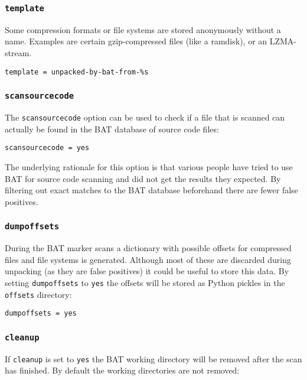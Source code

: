 \documentclass[10pt,a4paper]{article}
\begin{document}
\subsubsection{\texttt{template}}

Some compression formats or file systems are stored anonymously without a name.
Examples are certain gzip-compressed files (like a ramdisk), or an LZMA-stream.

\begin{verbatim}
template = unpacked-by-bat-from-%s
\end{verbatim}

\subsubsection{\texttt{scansourcecode}}

The \texttt{scansourcecode} option can be used to check if a file that is
scanned can actually be found in the BAT database of source code files:

\begin{verbatim}
scansourcecode = yes
\end{verbatim}

The underlying rationale for this option is that various people have tried to
use BAT for source code scanning and did not get the results they expected. By
filtering out exact matches to the BAT database beforehand there are fewer
false positives.

\subsubsection{\texttt{dumpoffsets}}

During the BAT marker scans a dictionary with possible offsets for compressed
files and file systems is generated. Although most of these are discarded
during unpacking (as they are false positives) it could be useful to store this
data. By setting \texttt{dumpoffsets} to \texttt{yes} the offsets will be
stored as Python pickles in the \texttt{offsets} directory:

\begin{verbatim}
dumpoffsets = yes
\end{verbatim}

\subsubsection{\texttt{cleanup}}

If \texttt{cleanup} is set to \texttt{yes} the BAT working directory will be
removed after the scan has finished. By default the working directories are not
removed:
\end{document}

